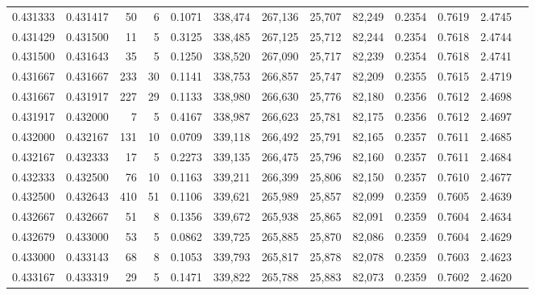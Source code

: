 \begin{tabular}{rrrrrrrrrrrrr}
0.431333 & 0.431417 &    50 &   6 &                                     0.1071 & 338,474 & 267,136 &  25,707 &  82,249 & 0.2354 & 0.7619 & 2.4745 \\
0.431429 & 0.431500 &    11 &   5 &                                     0.3125 & 338,485 & 267,125 &  25,712 &  82,244 & 0.2354 & 0.7618 & 2.4744 \\
0.431500 & 0.431643 &    35 &   5 &                                     0.1250 & 338,520 & 267,090 &  25,717 &  82,239 & 0.2354 & 0.7618 & 2.4741 \\
0.431667 & 0.431667 &   233 &  30 &                                     0.1141 & 338,753 & 266,857 &  25,747 &  82,209 & 0.2355 & 0.7615 & 2.4719 \\
0.431667 & 0.431917 &   227 &  29 &                                     0.1133 & 338,980 & 266,630 &  25,776 &  82,180 & 0.2356 & 0.7612 & 2.4698 \\
0.431917 & 0.432000 &     7 &   5 &                                     0.4167 & 338,987 & 266,623 &  25,781 &  82,175 & 0.2356 & 0.7612 & 2.4697 \\
0.432000 & 0.432167 &   131 &  10 &                                     0.0709 & 339,118 & 266,492 &  25,791 &  82,165 & 0.2357 & 0.7611 & 2.4685 \\
0.432167 & 0.432333 &    17 &   5 &                                     0.2273 & 339,135 & 266,475 &  25,796 &  82,160 & 0.2357 & 0.7611 & 2.4684 \\
0.432333 & 0.432500 &    76 &  10 &                                     0.1163 & 339,211 & 266,399 &  25,806 &  82,150 & 0.2357 & 0.7610 & 2.4677 \\
0.432500 & 0.432643 &   410 &  51 &                                     0.1106 & 339,621 & 265,989 &  25,857 &  82,099 & 0.2359 & 0.7605 & 2.4639 \\
0.432667 & 0.432667 &    51 &   8 &                                     0.1356 & 339,672 & 265,938 &  25,865 &  82,091 & 0.2359 & 0.7604 & 2.4634 \\
0.432679 & 0.433000 &    53 &   5 &                                     0.0862 & 339,725 & 265,885 &  25,870 &  82,086 & 0.2359 & 0.7604 & 2.4629 \\
0.433000 & 0.433143 &    68 &   8 &                                     0.1053 & 339,793 & 265,817 &  25,878 &  82,078 & 0.2359 & 0.7603 & 2.4623 \\
0.433167 & 0.433319 &    29 &   5 &                                     0.1471 & 339,822 & 265,788 &  25,883 &  82,073 & 0.2359 & 0.7602 & 2.4620 \\

\end{tabular}
